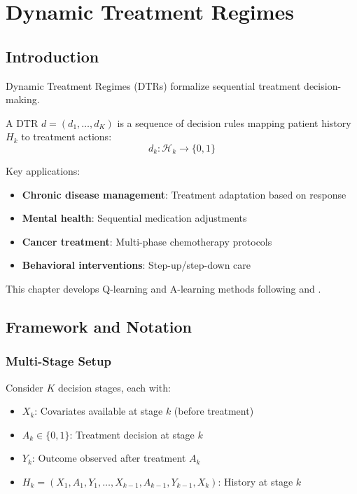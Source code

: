 \chapter{Dynamic Treatment Regimes}
\label{ch:dtr}

\section{Introduction}

Dynamic Treatment Regimes (DTRs) formalize sequential treatment decision-making.
\begin{definition}
A DTR $d = (d_1, \ldots, d_K)$ is a sequence of decision rules mapping patient history $H_k$ to treatment actions:
\begin{equation}
d_k: \mathcal{H}_k \to \{0, 1\}
\end{equation}
\end{definition}

Key applications:
\begin{itemize}
\item \textbf{Chronic disease management}: Treatment adaptation based on response
\item \textbf{Mental health}: Sequential medication adjustments
\item \textbf{Cancer treatment}: Multi-phase chemotherapy protocols
\item \textbf{Behavioral interventions}: Step-up/step-down care
\end{itemize}

This chapter develops Q-learning and A-learning methods following \textcite{murphy2003optimal} and \textcite{robins2004optimal}.


\section{Framework and Notation}

\subsection{Multi-Stage Setup}

Consider $K$ decision stages, each with:
\begin{itemize}
\item $X_k$: Covariates available at stage $k$ (before treatment)
\item $A_k \in \{0, 1\}$: Treatment decision at stage $k$
\item $Y_k$: Outcome observed after treatment $A_k$
\item $H_k = (X_1, A_1, Y_1, \ldots, X_{k-1}, A_{k-1}, Y_{k-1}, X_k)$: History at stage $k$
\end{itemize}

